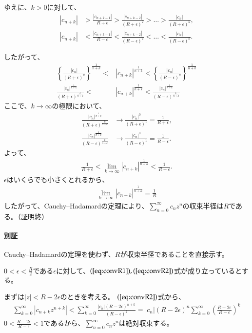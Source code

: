 ゆえに、$k>0$に対して、
\begin{align}
    |c_{n+k}|&>\frac{|c_{n+k-1}|}{R+\epsilon}>\frac{|c_{n+k-2}|}{(R+\epsilon)^2}>\dots>\frac{|c_{n}|}{(R+\epsilon)^k},\label{eq:convR1}\\
    |c_{n+k}|&<\frac{|c_{n+k-1}|}{R-\epsilon}<\frac{|c_{n+k-2}|}{(R-\epsilon)^2}<\dots<\frac{|c_{n}|}{(R-\epsilon)^k}.\label{eq:convR2}
\end{align}

したがって、
\begin{align*}
    \left\{\frac{|c_{n}|}{(R+\epsilon)^k}\right\}^\frac{1}{n+k}<&|c_{n+k}|^\frac{1}{n+k}< \left\{\frac{|c_{n}|}{(R-\epsilon)^k}\right\}^\frac{1}{n+k}\\
    \frac{|c_{n}|^\frac{1}{n+k}}{(R+\epsilon)^\frac{k}{n+k}}<&|c_{n+k}|^\frac{1}{n+k}< \frac{|c_{n}|^\frac{1}{n+k}}{(R-\epsilon)^\frac{k}{n+k}}
\end{align*}
ここで、$k\longrightarrow\infty$の極限において、
\begin{align*}
    \frac{|c_{n}|^\frac{1}{n+k}}{(R+\epsilon)^\frac{k}{n+k}}&\longrightarrow \frac{|c_{n}|^0}{(R+\epsilon)^1}=\frac{1}{R+\epsilon},\\
    \frac{|c_{n}|^\frac{1}{n+k}}{(R-\epsilon)^\frac{k}{n+k}}&\longrightarrow \frac{|c_{n}|^0}{(R-\epsilon)^1}=\frac{1}{R-\epsilon}.
\end{align*}
よって、
\begin{align*}
    \frac{1}{R+\epsilon}<\lim_{k\to\infty}|c_{n+k}|^\frac{1}{n+k}<\frac{1}{R-\epsilon}.
\end{align*}
$\epsilon$はいくらでも小さくとれるから、
\begin{align*}
    \lim_{k\to\infty}|c_{n+k}|^\frac{1}{n+k}=\frac{1}{R}
\end{align*}
したがって、Cauchy--Hadamardの定理により、$\sum_{n=0}^\infty c_nz^n$の収束半径は$R$である。（証明終）

\paragraph{別証}
Cauchy--Hadamardの定理を使わず、$R$が収束半径であることを直接示す。

$0<\epsilon<\frac{R}{2}$である$\epsilon$に対して、$(\ref{eq:convR1}),(\ref{eq:convR2})$式が成り立っているとする。

まずは$|z|<R-2\epsilon$のときを考える。
$(\ref{eq:convR2})$式から、
\begin{align*}
    \sum_{k=0}^\infty |c_{n+k}z^{n+k}|
    <\sum_{k=0}^\infty \frac{|c_n|(R-2\epsilon)^{n+k}}{(R-\epsilon)^k}=|c_n|(R-2\epsilon)^n\sum_{k=0}^\infty \left(\frac{R-2\epsilon}{R-\epsilon}\right)^k
\end{align*}
$0<\frac{R-2\epsilon}{R-\epsilon}<1$であるから、$\sum_{n=0}^\infty c_nz^n$は絶対収束する。

